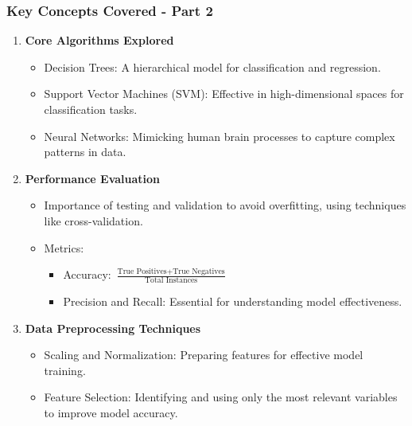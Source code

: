 \documentclass[aspectratio=169]{beamer}
\begin{document}
\begin{frame}[fragile]
    \frametitle{Key Concepts Covered - Part 2}
    \begin{enumerate}[resume]
        \item \textbf{Core Algorithms Explored}
            \begin{itemize}
                \item Decision Trees: A hierarchical model for classification and regression.
                \item Support Vector Machines (SVM): Effective in high-dimensional spaces for classification tasks.
                \item Neural Networks: Mimicking human brain processes to capture complex patterns in data.
            \end{itemize}
        \item \textbf{Performance Evaluation}
            \begin{itemize}
                \item Importance of testing and validation to avoid overfitting, using techniques like cross-validation.
                \item Metrics:
                    \begin{itemize}
                        \item Accuracy: \(\frac{\text{True Positives} + \text{True Negatives}}{\text{Total Instances}}\)
                        \item Precision and Recall: Essential for understanding model effectiveness.
                    \end{itemize}
            \end{itemize}
        \item \textbf{Data Preprocessing Techniques}
            \begin{itemize}
                \item Scaling and Normalization: Preparing features for effective model training.
                \item Feature Selection: Identifying and using only the most relevant variables to improve model accuracy.
            \end{itemize}
    \end{enumerate}
\end{frame}
\end{document}
